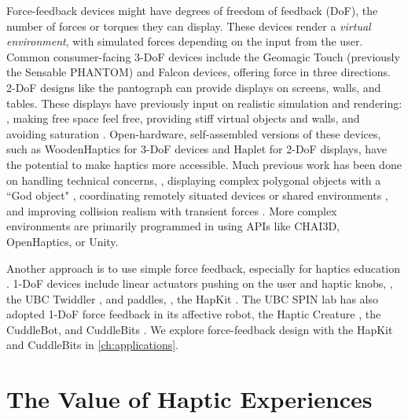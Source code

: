 Force-feedback devices might have degrees of freedom of feedback (DoF), the number of forces or torques they can display.
These devices render a \emph{virtual environment}, with simulated forces depending on the input from the user.
Common consumer-facing 3-DoF devices include the Geomagic Touch (previously the Sensable PHANTOM) and Falcon devices, offering force in three directions.
2-DoF designs like the pantograph \cite{Ramstein1994,Campion2005} can provide displays on screens, walls, and tables.
These displays have previously input on realistic simulation and rendering: \eg, making free space feel free, providing stiff virtual objects and walls, and avoiding saturation  \cite{massie1994phantom}.
Open-hardware, self-assembled versions of these devices, such as WoodenHaptics \cite{Forsslund2015} for 3-DoF devices and Haplet \cite{Gallacher2016} for 2-DoF displays, have the potential to make haptics more accessible.
Much previous work has been done on handling technical concerns, \eg, displaying complex polygonal objects with a ``God object" \cite{Zilles1995}, coordinating remotely situated devices or shared environments \cite{Buttolo1997}, and improving collision realism with transient forces \cite{Kuchenbecker2006}.
More complex environments are primarily programmed in using APIs like CHAI3D, OpenHaptics, or Unity.

Another approach is to use simple force feedback, especially for haptics education \cite{Jones2014}.
1-DoF devices include linear actuators pushing on the user and haptic knobs, \eg, the UBC Twiddler \cite{Shaver2003,Enriquez2003,MacLean2009a}, and paddles, \eg, the HapKit \cite{Martinez2016}.
The UBC SPIN lab has also adopted 1-DoF force feedback in its affective robot, the Haptic Creature \cite{Yohanan2011,Yohanan2011}, the CuddleBot, and CuddleBits \cite{cang2015cuddlebits}.
We explore force-feedback design with the HapKit and CuddleBits in \autoref{ch:applications}.


%

%
%
\section{The Value of Haptic Experiences}


